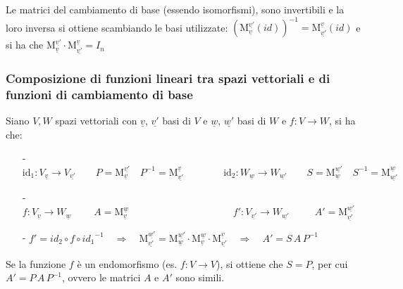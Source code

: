 \documentclass[a4paper]{article}
\newcommand\m[2]{\text{M}_{\underline{#1}}^{\underline{#2}}}
\begin{document}
Le matrici del cambiamento di base (essendo isomorfismi), sono invertibili e la loro inversa si ottiene scambiando le basi utilizzate:
\(\left( \m{v}{v'}(id) \right)^{-1} = \m{v'}{v}(id)\) e si ha che \(\m{v}{v'} \cdot \m{v'}{v} = I_n\)

\hypertarget{composizioneFunzioniCambiamentiDiBase}{\subsubsection*{Composizione di funzioni lineari tra spazi vettoriali e di funzioni di cambiamento di base}}
Siano \(V, W\) spazi vettoriali con \(\underline{v}\), \(\underline{v'}\) basi di \(V\) e \(\underline{w}\), \(\underline{w'}\)
basi di \(W\) e \(f: V \to W\), si ha che:
\begin{itemize}
	\item[-] \(\text{id}_1: V_{\underline{v}} \to V_{\underline{v'}} \qquad P = \m{v}{v'} \quad P^{-1} = \m{v'}{v} \qquad \qquad \text{id}_2: W_{\underline{w}} \to W_{\underline{w'}} \qquad S = \m{w}{w'} \quad S^{-1} = \m{w'}{w}\)
	\item[-] \(f: V_{\underline{v}} \to W_{\underline{w}} \qquad \; A = \m{v}{w} \qquad \qquad \qquad \qquad \qquad \;\; f': V_{\underline{v'}} \to W_{\underline{w'}} \qquad \;\; A' = \m{v'}{w'}\)
	\item[-] \(f' = id_2 \circ f \circ {id_1}^{-1} \quad \Rightarrow \quad \m{v'}{w'} = \m{w}{w'} \cdot \m{v}{w} \cdot \m{v'}{v} \quad \Rightarrow \quad A' = S \, A \, P^{-1}\)
\end{itemize}
Se la funzione \(f\) è un endomorfismo (es. \(f: V \to V\)), si ottiene che \(S = P\), per cui \(A' = P \, A \, P^{-1}\), ovvero
le matrici \(A\) e \(A'\) sono simili.

\newpage
\end{document}
